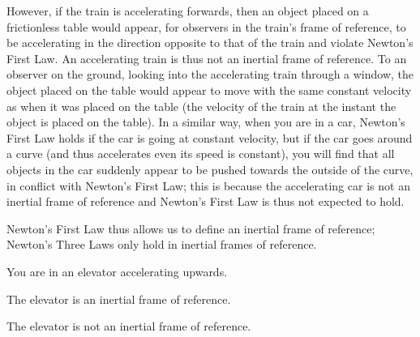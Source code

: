 However, if the train is accelerating forwards, then an object placed on a frictionless table would appear, for observers in the train's frame of reference, to be accelerating in the direction opposite to that of the train and violate Newton's First Law. An accelerating train is thus not an inertial frame of reference. To an observer on the ground, looking into the accelerating train through a window, the object placed on the table would appear to move with the same constant velocity as when it was placed on the table (the velocity of the train at the instant the object is placed on the table). In a similar way, when you are in a car, Newton's First Law holds if the car is going at constant velocity, but if the car goes around a curve (and thus accelerates even its speed is constant), you will find that all objects in the car suddenly appear to be pushed towards the outside of the curve, in conflict with Newton's First Law; this is because the accelerating car is not an inertial frame of reference and Newton's First Law is thus not expected to hold.

Newton's First Law thus allows us to define an inertial frame of reference; Newton's Three Laws only hold in inertial frames of reference.

\begin{checkpoint}
\begin{MCquestion}{You are in an elevator accelerating upwards.}
\item The elevator is an inertial frame of reference.
\item The elevator is not an inertial frame of reference.\correct
\end{MCquestion}
\end{checkpoint}

